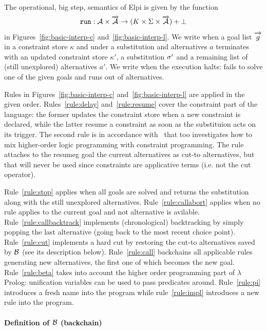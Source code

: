 \documentclass[a4paper, 11pt]{book}
\begin{document}
The operational, big step, semantics of Elpi is given by the function
$$
\run{} : \alt \times \vecL{\alt} \to (K  \times \Sigma \times \vecL{\alt}) + \bot
$$
in Figures~\cref{fig:basic-interp-c} and~\cref{fig:basic-interp-l}.
We write 
when a goal list $\vecL{g}$ in a constraint store $\kappa$ and under a substitution \subst and alternatives $a$
terminates with an updated constraint store $\kappa'$, a substitution $\sigma'$ and a remaining list of
(still unexplored) alternatives $a'$. We write  
when the execution halts: fails to solve one of the given goals and runs out of
alternatives. 

Rules in Figures~\cref{fig:basic-interp-c} and~\cref{fig:basic-interp-l}
are applied in the given order. Rules~\ref{rule:delay} and~\ref{rule:resume}
cover the constraint part of the language: the former updates the constraint
store when a new constraint is declared, while the latter resume a constraint
as soon as the substituion \subst acts on its trigger. The second rule
is in accordance with~\cite{Michaylov1993HigherOrderLP} that too investigates
how to mix higher-order logic programming with constraint programming.
The rule attaches to the resumeg goal the current alternatives as cut-to
alternatives, but that will never be used since constraints are applicative
terms (i.e. not the cut operator).

Rule~\ref{rule:stop} applies when all goals are solved and returns
the substitution along with the still unexplored alternatives.
Rule~\ref{rule:callabort} applies when no rule applies to the
current goal and not alternative is avilable.
Rule~\ref{rule:callbacktrack} implements (chronological) backtracking by simply
popping the last alternative (going back to the most recent choice point).
Rule~\ref{rule:cut} implements a hard cut by restoring the cut-to alternatives
saved by $\mathcal{B}$ (see its description below).
Rule~\ref{rule:call} backchains all applicable rules generating new
alternatives, the first one of which becomes the new goal.
Rule~\ref{rule:beta} takes into account the higher order programming part
of $\lambda$Prolog: unification variables can be used to pass
predicates around.
Rule~\ref{rule:pi} introduces a fresh name into the program
while rule~\ref{rule:impl} introduces a new rule into the program.

\paragraph{Definition of $\mathcal{B}$ (backchain)}
\end{document}
